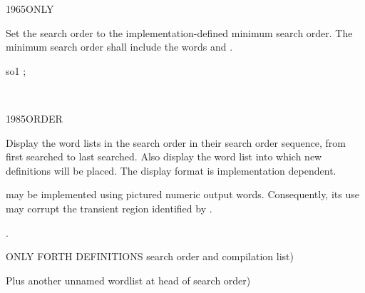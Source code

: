 \begin{worddef}{1965}{ONLY}
\item \stack{}{}

	Set the search order to the implementation-defined minimum search
	order. The minimum search order shall include the words
	 and .

	\begin{implement}
	\end{implement}

	\begin{testing}\ttfamily

		\word{:} so1  {;}  

		 \\
	\end{testing}
\end{worddef}


\begin{worddef}{1985}{ORDER}
\item \stack{}{}

	Display the word lists in the search order in their search order
	sequence, from first searched to last searched. Also display the
	word list into which new definitions will be placed. The display
	format is implementation dependent.

	 may be implemented using pictured numeric output
	words. Consequently, its use may corrupt the transient region
	identified by .

\see {}.

	\begin{testing}\ttfamily
		  ONLY FORTH DEFINITIONS search order and compilation list)  \\

		  Plus another unnamed wordlist at head of search order)  \\
	\end{testing}
\end{worddef}


